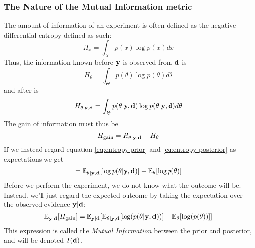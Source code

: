 \subsubsection{The Nature of the Mutual Information metric}
The amount of information of an experiment is often defined as the negative differential entropy defined as such\cite{lindley56}:
\begin{equation}H_x = \int_{X}p(x)\log p(x)dx\end{equation}
Thus, the information known before $\mathbf{y}$ is observed from $\mathbf{d}$ is
\begin{equation}\label{eq:entropy-prior}H_\theta = \int_{\Theta}p(\theta)\log p(\theta)d\theta\end{equation}
and after is
\begin{equation}\label{eq:entropy-posterior}H_{\theta | \mathbf{y}, \mathbf{d}} = \int_{\Theta}p(\theta| \mathbf{y}, \mathbf{d})\log p(\theta| \mathbf{y}, \mathbf{d})d\theta\end{equation}
The gain of information must thus be
\begin{equation}H_\textrm{gain} = H_{\theta | \mathbf{y}, \mathbf{d}} - H_\theta\end{equation}
If we instead regard equation \ref{eq:entropy-prior} and \ref{eq:entropy-posterior} as expectations we get
\begin{equation} = \mathbb{E}_{\theta | \mathbf{y}, \mathbf{d}}[\log p(\theta | \mathbf{y}, \mathbf{d})] - \mathbb{E}_\theta [\log p(\theta )]\end{equation}
Before we perform the experiment, we do not know what the outcome will be. Instead, we'll just regard the expected outcome by taking the expectation over the observed evidence $\mathbf{y} | \mathbf{d}$:
\begin{equation} \label{eq:mi-bad}\mathbb{E}_{\mathbf{y} | \mathbf{d}}[H_\textrm{gain}]  = \mathbb{E}_{\mathbf{y} | \mathbf{d}}[\mathbb{E}_{\theta | \mathbf{y}, \mathbf{d}} [\log(p(\theta | \mathbf{y}, \mathbf{d}))] - \mathbb{E}_{\theta}[\log(p(\theta))]]\end{equation}
This expression is called the \textit{Mutual Information} between the prior and posterior, and will be denoted $I(\mathbf{d})$.\\

